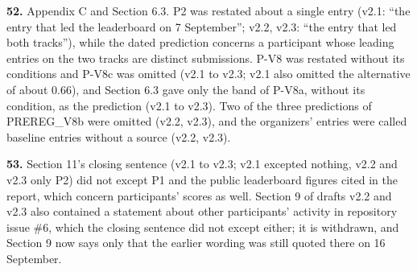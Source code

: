 \noindent\textbf{52.} Appendix C and Section 6.3. P2 was restated about a single entry (v2.1: ``the entry that led the leaderboard on 7 September''; v2.2, v2.3: ``the entry that led both tracks''), while the dated prediction concerns a participant whose leading entries on the two tracks are distinct submissions. P-V8 was restated without its conditions and P-V8c was omitted (v2.1 to v2.3; v2.1 also omitted the alternative of about 0.66), and Section 6.3 gave only the band of P-V8a, without its condition, as the prediction (v2.1 to v2.3). Two of the three predictions of PREREG\_V8b were omitted (v2.2, v2.3), and the organizers' entries were called baseline entries without a source (v2.2, v2.3).
\par

\noindent\textbf{53.} Section 11's closing sentence (v2.1 to v2.3; v2.1 excepted nothing, v2.2 and v2.3 only P2) did not except P1 and the public leaderboard figures cited in the report, which concern participants' scores as well. Section 9 of drafts v2.2 and v2.3 also contained a statement about other participants' activity in repository issue \#6, which the closing sentence did not except either; it is withdrawn, and Section 9 now says only that the earlier wording was still quoted there on 16 September.
\par

